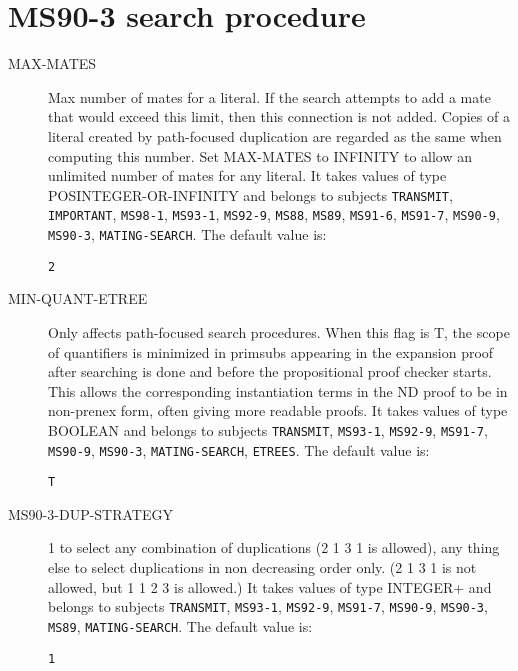 \section{MS90-3 search procedure}

\begin{description} 
\item[MAX-MATES]  
Max number of mates for a literal. If the search attempts to
add a mate that would exceed this limit, then this connection is not added.
Copies of a literal created by path-focused duplication are regarded as
the same when computing this number.
Set MAX-MATES to INFINITY to allow an unlimited number of mates for any 
literal.
It takes values of type POSINTEGER-OR-INFINITY and belongs to subjects \texttt{TRANSMIT}, \texttt{IMPORTANT}, \texttt{MS98-1}, \texttt{MS93-1}, \texttt{MS92-9}, \texttt{MS88}, \texttt{MS89}, \texttt{MS91-6}, \texttt{MS91-7}, \texttt{MS90-9}, \texttt{MS90-3}, \texttt{MATING-SEARCH}.  The default value is: \begin{lstlisting}
2
\end{lstlisting}

\item[MIN-QUANT-ETREE]  
Only affects path-focused search procedures. When this flag
is T, the scope of quantifiers is minimized in primsubs appearing in
the expansion proof after searching is done and before the
propositional proof checker starts. This allows the corresponding
instantiation terms in the ND proof to be in non-prenex form, often
giving more readable proofs.
It takes values of type BOOLEAN and belongs to subjects \texttt{TRANSMIT}, \texttt{MS93-1}, \texttt{MS92-9}, \texttt{MS91-7}, \texttt{MS90-9}, \texttt{MS90-3}, \texttt{MATING-SEARCH}, \texttt{ETREES}.  The default value is: \begin{lstlisting}
T
\end{lstlisting}

\item[MS90-3-DUP-STRATEGY]  
1 to select any combination of duplications (2 1 3 1 is
allowed), any thing else to select duplications in non decreasing
order only. (2 1 3 1 is not allowed, but 1 1 2 3 is allowed.)
It takes values of type INTEGER+ and belongs to subjects \texttt{TRANSMIT}, \texttt{MS93-1}, \texttt{MS92-9}, \texttt{MS91-7}, \texttt{MS90-9}, \texttt{MS90-3}, \texttt{MS89}, \texttt{MATING-SEARCH}.  The default value is: \begin{lstlisting}
1
\end{lstlisting}


\end{description}
